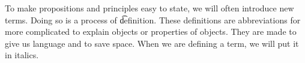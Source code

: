 
To make propositions and principles easy to state, we will often introduce new terms.
Doing so is a process of \t{definition}.
These definitions are abbreviations for more complicated to explain objects or properties of objects.
They are made to give us language and to save space.
When we are defining a term, we will put it in italics.


